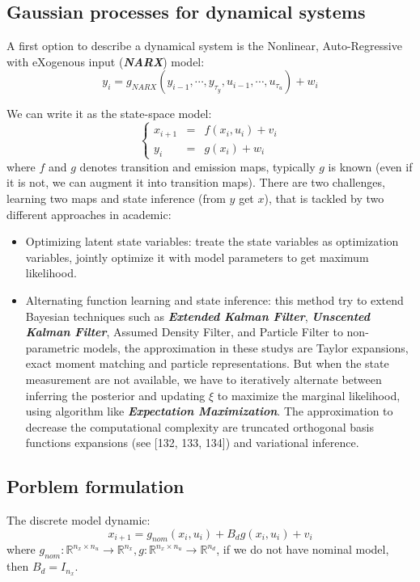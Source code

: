 \documentclass[10pt]{elegantbook}
\newcommand{\mydefination}[1]{\textbf{\textit{\textcolor{structurecolor}{#1}}}}
\begin{document}
\subsection{Gaussian processes for dynamical systems}
A first option to describe a dynamical system is the Nonlinear, Auto-Regressive with eXogenous input (\mydefination{NARX}) model:
\[
y_i = g_{NARX}(y_{i-1}, \cdots, y_{\tau_y}, u_{i-1}, \cdots, u_{\tau_u}) + w_i
\]

We can write it as the state-space model:
\begin{equation}
    \left \{ 
    \begin{array}{rll}
        x_{i+1} &=& f(x_i, u_i) + v_i \\
        y_i &=& g(x_i) + w_i
    \end{array}    
    \right .    
\end{equation}
where $f$ and $g$ denotes transition and emission maps, typically $g$ is known (even if it is not, we can augment it into 
transition maps). There are two challenges, learning two maps and state inference (from $y$ get $x$), that is tackled by two
different approaches in academic:
\begin{itemize}
    \item Optimizing latent state variables: treate the state variables as optimization variables, jointly optimize it with 
model parameters to get maximum likelihood.
    \item Alternating function learning and state inference: this method try to extend Bayesian techniques such as 
\mydefination{Extended Kalman Filter}, \mydefination{Unscented Kalman Filter}, Assumed Density Filter, and Particle Filter 
to non-parametric models, the approximation in these 
studys are Taylor expansions, exact moment matching and particle representations. But when the state measurement
are not available, we have to iteratively alternate between inferring the posterior and updating $ \xi $ to maximize the 
marginal likelihood, using algorithm like \mydefination{Expectation Maximization}. The approximation to decrease the computational
complexity are truncated orthogonal basis functions expansions (see [132, 133, 134]) and variational inference.
\end{itemize}

\subsection{Porblem formulation}
The discrete model dynamic:
\begin{equation} \label{eq:gp_dynamic_model}
    x_{i+1} = g_{nom}(x_i, u_i) + B_d g(x_i, u_i) + v_i
\end{equation}
where $g_{nom}: \mathbb R^{n_x \times n_u} \rightarrow \mathbb R^{n_x}, g: \mathbb R^{n_x \times n_u} \rightarrow \mathbb R^{n_d}$, 
if we do not have nominal model, then $B_d = I_{n_x}$.
\end{document}
